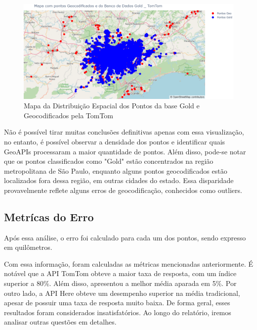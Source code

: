 \documentclass{article}
\begin{document}
\begin{figure}[h]
  \centering
  \includegraphics[width=\textwidth]{mapapontos3.png}
  \caption{Mapa da Distribuição Espacial dos Pontos da base Gold e Geocodificados pela TomTom}
  \label{fig:mapapontos3}
\end{figure}

Não é possível tirar muitas conclusões definitivas apenas com essa visualização, no entanto, é possível observar a densidade dos pontos e identificar quais GeoAPIs processaram a maior quantidade de pontos. Além disso, pode-se notar que os pontos classificados como "Gold" estão concentrados na região metropolitana de São Paulo, enquanto alguns pontos geocodificados estão localizados fora dessa região, em outras cidades do estado. Essa disparidade provavelmente reflete alguns erros de geocodificação, conhecidos como outliers.

\subsection{Metrícas do Erro}
Após essa análise, o erro foi calculado para cada um dos pontos, sendo expresso em quilômetros.

Com essa informação, foram calculadas as métricas mencionadas anteriormente. É notável que a API TomTom obteve a maior taxa de resposta, com um índice superior a 80\%. Além disso, apresentou a melhor média aparada em 5\%. Por outro lado, a API Here obteve um desempenho superior na média tradicional, apesar de possuir uma taxa de resposta muito baixa. De forma geral, esses resultados foram considerados insatisfatórios. Ao longo do relatório, iremos analisar outras questões em detalhes.
\end{document}
